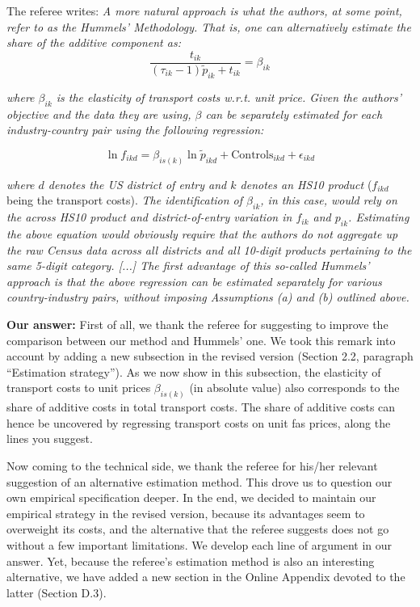\documentclass[a4paper,11pt]{article}
\begin{document}
The referee writes: \textit{A more natural approach is what the authors, at some point, refer to as the Hummels' Methodology. That is, one can alternatively estimate the share of the additive component as:}
$$\frac{t_{ik}}{ (\tau_{ik}-1)\tilde{p}_{ik} + t_{ik}} = \beta_{ik}$$

\textit{where $\beta_{ik}$ is the elasticity of transport costs w.r.t. unit price. Given the authors' objective and the data they are using, $\beta$ can be separately estimated for each industry-country pair using the following regression:}

\begin{equation}
\ln f_{ikd} = \beta_{is(k)}\ln \tilde{p}_{ikd} + \text{Controls}_{ikd} +\epsilon_{ikd} \label{eq:estimation_ref1}
\end{equation}

\textit{where $d$ denotes the US district of entry and $k$ denotes an HS10 product} ($f_{ikd}$ being the transport costs). \textit{The
identification of $\beta_{ik}$, in this case, would rely on the across HS10 product and
district-of-entry variation in $f_{ik}$ and $p_{ik}$. Estimating the above equation would
obviously require that the authors do not aggregate up the raw Census data
across all districts and all 10-digit products pertaining to the same 5-digit category. [...] The first advantage of this so-called Hummels' approach is that the above regression can be estimated separately for various country-industry pairs, without imposing Assumptions (a) and (b) outlined above.}

\textbf{Our answer:} First of all, we thank the referee for suggesting to improve the comparison between our method and Hummels' one. We took this remark into account by adding a new subsection in the revised version (Section 2.2, paragraph ``Estimation strategy''). As we now show in this subsection, the elasticity of transport costs to unit prices $\beta_{is(k)}$ (in absolute value) also corresponds to the share of additive costs in total transport costs. The share of additive costs can hence be uncovered by regressing transport costs on unit fas prices, along the lines you suggest.

Now coming to the technical side, we thank the referee for his/her relevant suggestion of an alternative estimation method. This drove us to question our own empirical specification deeper. In the end, we decided to maintain our empirical strategy in the revised version, because its advantages seem to overweight its costs, and the alternative that the referee suggests does not go without a few important limitations. We develop each line of argument in our answer. Yet, because the referee's estimation method is also an interesting alternative, we have added a new section in the Online Appendix devoted to the latter (Section D.3).
\end{document}
